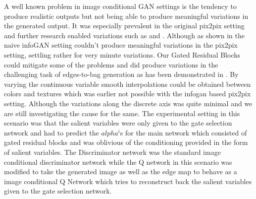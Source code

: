 A well known problem in image conditional GAN settings is the tendency to produce realistic outputs but not being able to produce meaningful variations in the generated output. It was especially prevalent in the original pix2pix setting \cite{isola2016image2image} and further research enabled variations such as \cite{ghosh2017multi} and \cite{zhu2017toward}. Although as shown in \cite{ghosh2017multi} the naive infoGAN setting couldn't produce meaningful variations in the pix2pix setting, settling rather for very minute variations. Our Gated Residual Blocks could mitigate some of the problems and did produce variations in the challenging task of edges-to-bag generation as has been demonstrated in . By varying the continuous variable smooth interpolations could be obtained between colors and textures which was earlier not possible with the infogan based pix2pix setting. Although the variations along the discrete axis was quite minimal and we are still investigating the cause for the same. The experimental setting in this scenario was that the salient variables were only given to the gate selection network and had to predict the $alpha^i$s for the main network which consisted of gated residual blocks and was oblivious of the conditioning provided in the form of salient variables. The Discriminator network was the standard image conditional discriminator network while the Q network in this scenario was modified to take the generated image as well as the edge map to behave as a image conditional Q Network which tries to reconstruct back the salient variables given to the gate selection network. 

\newcommand{\addSubFigEighth}[3]{\begin{subfigure}[t]{.18\linewidth}
   \texttt{[image: \#1]}
   \caption{#2}\label{#3}\end{subfigure}
}
\newcommand{\addSubFigEighthCaptionless}[3]{\begin{subfigure}[t]{.18\linewidth}
   \texttt{[image: \#1]}
   \label{#2}\end{subfigure}
}

